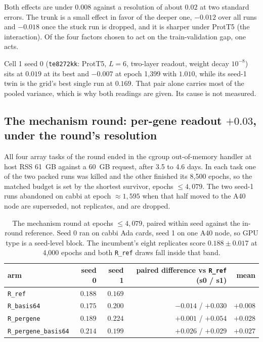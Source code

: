  Both effects are under $0.008$
against a resolution of about $0.02$ at two standard errors. The trunk is a small effect in
favor of the deeper one, $-0.012$ over all runs and $-0.018$ once the stuck run is dropped,
and it is sharper under ProtT5 (the interaction). Of the four factors chosen to act on the
train-validation gap, one acts.

 Cell 1 seed 0 (\texttt{te8272kk}: ProtT5, $L{=}6$,
two-layer readout, weight decay $10^{-8}$) sits at $0.019$ at its best and $-0.007$ at
epoch 1{,}399 with  $1.010$, while its seed-1 twin is the grid's best single run
at $0.169$. That pair alone carries most of the pooled variance, which is why both readings
are given. Its cause is not measured.

\subsection{The mechanism round: per-gene readout $+0.03$, under the round's resolution
}
\label{sec:readouts-mech}

All four array tasks of the round ended in the cgroup out-of-memory handler at host RSS
61~GB against a 60~GB request, after 3.5 to 4.6 days. In each task one of the two packed
runs was killed and the other finished its 8{,}500 epochs, so the matched budget is set by
the shortest survivor, epochs $\le 4{,}079$. The two seed-1 runs abandoned on cabbi at epoch
${\approx}1{,}595$ when that half moved to the A40 node are superseded, not replicates, and
are dropped.

\begin{table}[htbp]
\centering\small
\begin{tabular}{lrrrr}
\toprule
arm & seed 0 & seed 1 & paired difference vs \texttt{R\_ref} (s0 / s1) & mean \\
\midrule
\texttt{R\_ref}               & $0.188$ & $0.169$ & & \\
\texttt{R\_basis64}           & $0.175$ & $0.200$ & $-0.014$ / $+0.030$ & $+0.008$ \\
\texttt{R\_pergene}           & $0.189$ & $0.224$ & $+0.001$ / $+0.054$ & $+0.028$ \\
\texttt{R\_pergene\_basis64}  & $0.214$ & $0.199$ & $+0.026$ / $+0.029$ & $+0.027$ \\
\bottomrule
\end{tabular}
\caption[]{The mechanism round at epochs $\le 4{,}079$, paired within seed against the
in-round reference. Seed 0 ran on cabbi Ada cards, seed 1 on one A40 node, so GPU type is
a seed-level block. The incumbent's eight replicates score $0.188 \pm 0.017$ at 4{,}000
epochs and both \texttt{R\_ref} draws fall inside that band.}
\label{tab:readouts-mech}
\end{table}

